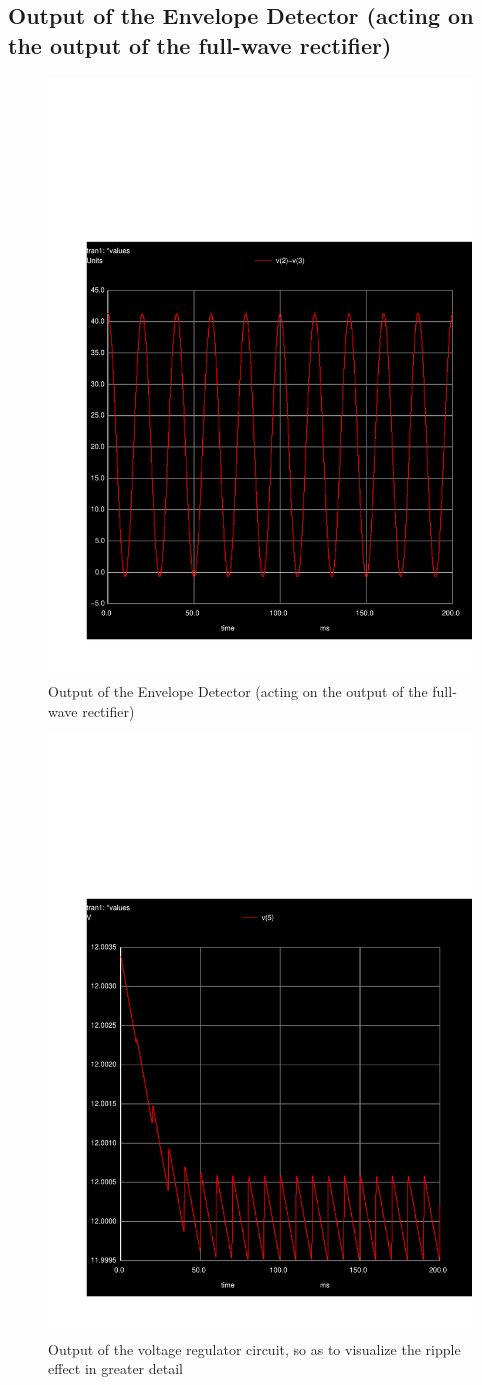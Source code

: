 \subsection{Output of the Envelope Detector (acting on the output of the full-wave rectifier)}

\par
\begin{figure}[H] \centering
\includegraphics[width=0.6\linewidth]{vrect.pdf}
\caption{Output of the Envelope Detector (acting on the output of the full-wave rectifier)}
\label{fig:env}
\end{figure}



\par
\begin{figure}[H] \centering
\includegraphics[width=0.6\linewidth]{vout.pdf}
\caption{Output of the voltage regulator circuit, so as to visualize the ripple effect in greater detail}
\label{fig:vout}
\end{figure}

